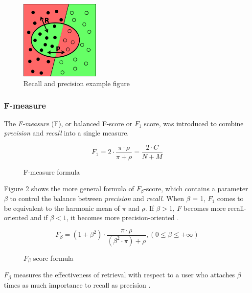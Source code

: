 \begin{figure}[H]
\centering
\includegraphics[width=0.35\textwidth]{recall-precision.png}
\caption{Recall and precision example figure \cite{Wikipedia:Precision_and_recall}}
\label{fig:recall-precision}
\end{figure}

\subsubsection{F-measure}
The \textit{F-measure} (F), or  balanced F-score or $\textit{F}_\textit{1}$ score, was introduced to combine \textit{precision} and \textit{recall} into a single measure.

\begin{figure}[H]
\begin{displaymath}
	F_1 = 2 \cdot \frac{\pi \cdot \rho}{\pi + \rho} = \frac{2 \cdot C}{N + M}
\end{displaymath}
\caption{F-measure formula}
\end{figure}

Figure \ref{fig:fbeta-score} shows the more general formula of $F_\beta$-score, which contains a parameter $\beta$ to control the balance between \textit{precision} and \textit{recall}. When $\beta$ = 1, $F_1$ comes to be equivalent to the harmonic mean of $\pi$ and $\rho$. If $\beta > 1$, $F$ becomes more recall-oriented and if $\beta < 1$, it becomes more precision-oriented \cite{Sasaki:2007}.

\begin{figure}[H]
\begin{displaymath}
	F_\beta = (1+\beta^2) \cdot \frac{\pi \cdot \rho}{(\beta^2 \cdot \pi) + \rho}, (0 \le \beta \le +\infty)
\end{displaymath}
\caption{$\textit{F}_\beta$-score formula \cite{Chinchor:1992}}
\label{fig:fbeta-score}
\end{figure}

$\textit{F}_\beta$ measures the effectiveness of retrieval with respect to a user who attaches $\beta$ times as much importance to recall as precision \cite{Rijsbergen:1979}.

